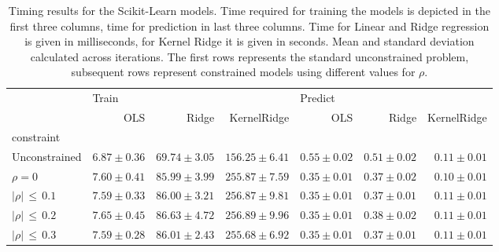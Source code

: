\documentclass[utf8]{frontiersSCNS} %
\begin{document}
\begin{table}[]
\begin{tabular}{lrrrrrr}
\toprule
 & \multicolumn{3}{l}{Train} & \multicolumn{3}{l}{Predict} \\
 &   OLS & Ridge & KernelRidge &     OLS & Ridge & KernelRidge \\
constraint         &       &       &             &         &       &             \\
\midrule
Unconstrained      &  $6.87\pm 0.36$& $69.74\pm 3.05$&      $156.25\pm 6.41$ &    $0.55\pm 0.02$&  $0.51\pm 0.02$ & $0.11\pm 0.01$\\
$\rho=0$             &  $7.60\pm 0.41$& $85.99\pm 3.99$& $255.87\pm 7.59$& $0.35\pm 0.01$& $0.37\pm 0.02$& $0.10\pm 0.01$\\
$|\rho|\, \le\, 0.1$ &  $7.59\pm 0.33$& $86.00\pm 3.21$& $256.87\pm 9.81$& $0.35\pm 0.01$& $0.37\pm 0.01$& $0.11\pm 0.01$\\
$|\rho|\, \le\, 0.2$ &  $7.65\pm 0.45$& $86.63\pm 4.72$& $256.89\pm 9.96$& $0.35\pm 0.01$& $0.38\pm 0.02$& $0.11\pm 0.01$\\
$|\rho|\, \le\, 0.3$ &  $7.59\pm 0.28$& $86.01\pm 2.43$& $255.68\pm 6.92$& $0.35\pm 0.01$& $0.37\pm 0.01$& $0.11\pm 0.01$\\
\bottomrule
\end{tabular}
\caption{Timing results for the Scikit-Learn models. Time required for training the models is depicted in the first three columns, time for prediction in last three columns. Time for Linear and Ridge regression is given in milliseconds, for Kernel Ridge it is given in seconds. Mean and standard deviation calculated across iterations. The first rows represents the standard unconstrained problem, subsequent rows represent constrained models using different values for $\rho$.}
\label{tab:timing}
\end{table}
\end{document}
